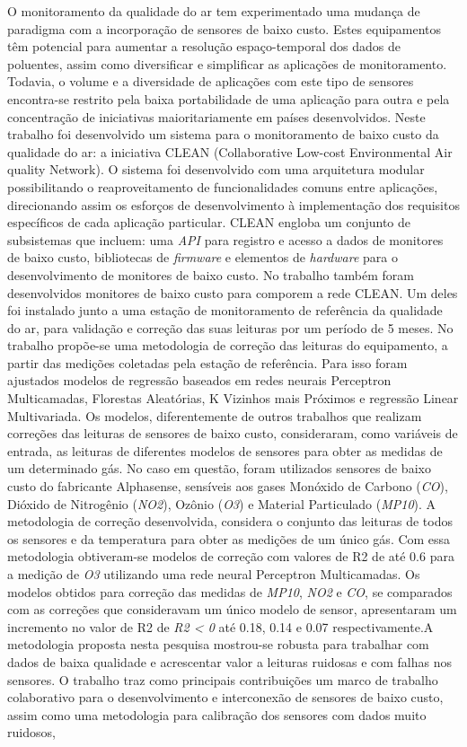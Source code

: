 \begin{resumo}
	\SingleSpacing
	O monitoramento da qualidade do ar tem experimentado uma mudança de paradigma com a incorporação de sensores de baixo custo. Estes equipamentos têm potencial para aumentar a resolução espaço-temporal dos dados de poluentes, assim como diversificar e simplificar as aplicações de monitoramento. Todavia, o volume e a diversidade de aplicações com este tipo de sensores encontra-se restrito pela baixa portabilidade de uma aplicação para outra e pela concentração de iniciativas maioritariamente em países desenvolvidos. Neste trabalho foi desenvolvido um sistema para o monitoramento de baixo custo da qualidade do ar: a iniciativa CLEAN (Collaborative Low-cost Environmental Air quality Network). O sistema foi desenvolvido com uma arquitetura modular possibilitando o reaproveitamento de funcionalidades comuns entre aplicações, direcionando assim os esforços de desenvolvimento à implementação dos requisitos específicos de cada aplicação particular. CLEAN engloba um conjunto de subsistemas que incluem: uma \textit{API} para registro e acesso a dados de monitores de baixo custo, bibliotecas de \textit{firmware} e elementos de \textit{hardware} para o desenvolvimento de monitores de baixo custo. No trabalho também foram desenvolvidos monitores de baixo custo para comporem a rede CLEAN. Um deles foi instalado junto a uma estação de monitoramento de referência da qualidade do ar, para validação e correção das suas leituras por um período de 5 meses. No trabalho propõe-se uma metodologia de correção das leituras do equipamento, a partir das medições coletadas pela estação de referência. Para isso foram ajustados modelos de regressão baseados em redes neurais Perceptron Multicamadas, Florestas Aleatórias, K Vizinhos mais Próximos e regressão Linear Multivariada. Os modelos, diferentemente de outros trabalhos que realizam correções das leituras de sensores de baixo custo, consideraram, como variáveis de entrada, as leituras de diferentes modelos de sensores para obter as medidas de um determinado gás. No caso em questão, foram utilizados sensores de baixo custo do fabricante Alphasense, sensíveis aos gases Monóxido de Carbono (\textit{CO}), Dióxido de Nitrogênio (\textit{NO2}), Ozônio (\textit{O3}) e Material Particulado (\textit{MP10}). A metodologia de correção desenvolvida, considera o conjunto das leituras de todos os sensores e da temperatura para obter as medições de um único gás. Com essa metodologia obtiveram-se modelos de correção com valores de R2 de até 0.6 para a medição de \textit{O3} utilizando uma rede neural Perceptron Multicamadas. Os modelos obtidos para correção das medidas de \textit{MP10}, \textit{NO2} e \textit{CO}, se comparados com as correções que consideravam um único modelo de sensor, apresentaram um incremento no valor de R2 de \textit{R2 < 0} até 0.18, 0.14 e 0.07 respectivamente.A metodologia proposta nesta pesquisa mostrou-se robusta para trabalhar com dados de baixa qualidade e acrescentar valor a leituras ruidosas e com falhas nos sensores. O trabalho traz como principais contribuições um marco de trabalho colaborativo para o desenvolvimento e interconexão de sensores de baixo custo, assim como uma metodologia para calibração dos sensores com dados muito ruidosos, 
\end{resumo}

